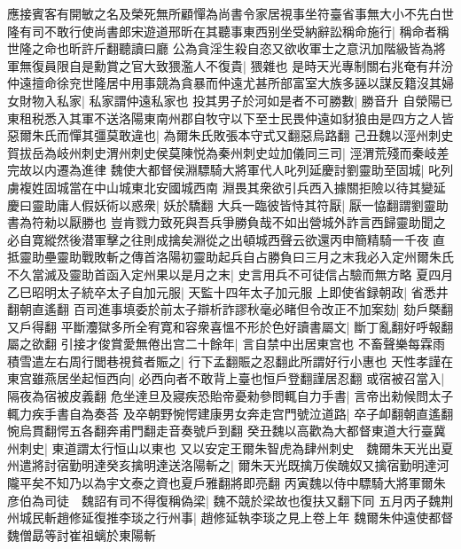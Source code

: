 應接賓客有開敏之名及榮死無所顧憚為尚書令家居視事坐符臺省事無大小不先白世隆有司不敢行使尚書郎宋遊道邢昕在其聽事東西别坐受納辭訟稱命施行|{
	稱命者稱世隆之命也昕許斤翻聽讀曰廳}
公為貪淫生殺自恣又欲收軍士之意汛加階級皆為將軍無復員限自是勳賞之官大致猥濫人不復貴|{
	猥雜也}
是時天光專制關右兆奄有幷汾仲遠擅命徐兖世隆居中用事競為貪暴而仲遠尤甚所部富室大族多誣以謀反籍沒其婦女財物入私家|{
	私家謂仲遠私家也}
投其男子於河如是者不可勝數|{
	勝音升}
自滎陽已東租税悉入其軍不送洛陽東南州郡自牧守以下至士民畏仲遠如豺狼由是四方之人皆惡爾朱氏而憚其彊莫敢違也|{
	為爾朱氏敗張本守式又翻惡烏路翻}
己丑魏以涇州刺史賀拔岳為岐州刺史渭州刺史侯莫陳悦為秦州刺史竝加儀同三司|{
	涇渭荒殘而秦岐差完故以内遷為進律}
魏使大都督侯淵驃騎大將軍代人叱列延慶討劉靈助至固城|{
	叱列虜複姓固城當在中山城東北安國城西南}
淵畏其衆欲引兵西入據關拒險以待其變延慶曰靈助庸人假妖術以惑衆|{
	妖於驕翻}
大兵一臨彼皆恃其符厭|{
	厭一恊翻謂劉靈助書為符勑以厭勝也}
豈肯戮力致死與吾兵爭勝負哉不如出營城外詐言西歸靈助聞之必自寛縱然後潜軍擊之往則成擒矣淵從之出頓城西聲云欲還丙申簡精騎一千夜直抵靈助壘靈助戰敗斬之傳首洛陽初靈助起兵自占勝負曰三月之末我必入定州爾朱氏不久當滅及靈助首函入定州果以是月之末|{
	史言用兵不可徒信占驗而無方略}
夏四月乙巳昭明太子統卒太子自加元服|{
	天監十四年太子加元服}
上即使省録朝政|{
	省悉井翻朝直遙翻}
百司進事填委於前太子辯析詐謬秋毫必睹但令改正不加案劾|{
	劾戶槩翻又戶得翻}
平斷灋獄多所全宥寛和容衆喜慍不形於色好讀書屬文|{
	斷丁亂翻好呼報翻屬之欲翻}
引接才俊賞愛無倦出宫二十餘年|{
	言自禁中出居東宫也}
不畜聲樂每霖雨積雪遣左右周行閭巷視貧者賑之|{
	行下孟翻賑之忍翻此所謂好行小惠也}
天性孝謹在東宫雖燕居坐起恒西向|{
	必西向者不敢背上臺也恒戶登翻謹居忍翻}
或宿被召當入|{
	隔夜為宿被皮義翻}
危坐達旦及寢疾恐貽帝憂勑參問輒自力手書|{
	言帝出勑候問太子輒力疾手書自為奏荅}
及卒朝野惋愕建康男女奔走宫門號泣道路|{
	卒子卹翻朝直遙翻惋烏貫翻愕五各翻奔甫門翻走音奏號戶到翻}
癸丑魏以高歡為大都督東道大行臺冀州刺史|{
	東道謂太行恒山以東也}
又以安定王爾朱智虎為肆州刺史　魏爾朱天光出夏州遣將討宿勤明達癸亥擒明達送洛陽斬之|{
	爾朱天光既擒万俟醜奴又擒宿勤明達河隴平矣不知乃以為宇文泰之資也夏戶雅翻將即亮翻}
丙寅魏以侍中驃騎大將軍爾朱彦伯為司徒　魏詔有司不得復稱偽梁|{
	魏不競於梁故也復扶又翻下同}
五月丙子魏荆州城民斬趙修延復推李琰之行州事|{
	趙修延執李琰之見上卷上年}
魏爾朱仲遠使都督魏僧勗等討崔祖螭於東陽斬

